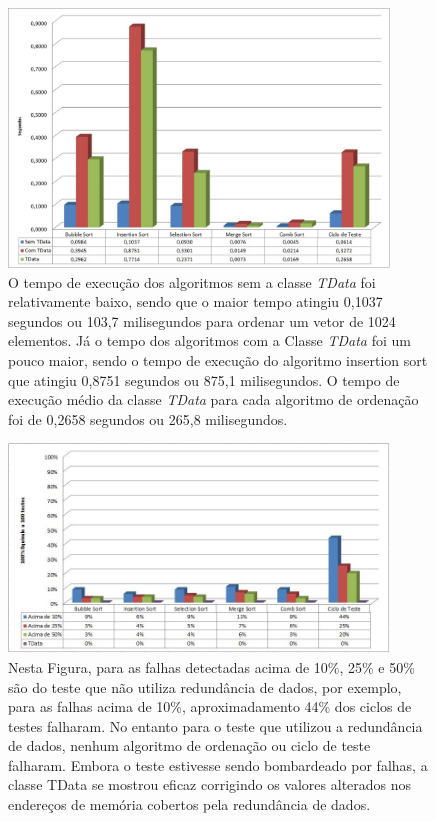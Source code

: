 \begin{figure}[h]
	\centering
	\includegraphics[width=0.9\textwidth]{figuras/tempoTData.jpg}
	\caption[Tempo de execução da Classe \textit{TData}]{O tempo de execução dos algoritmos sem a classe \textit{TData} foi relativamente baixo, sendo que o maior tempo atingiu 0,1037 segundos ou 103,7 milisegundos para ordenar um vetor de 1024 elementos. Já o tempo dos algoritmos com a Classe \textit{TData} foi um pouco maior, sendo o tempo de execução do algoritmo insertion sort que atingiu 0,8751 segundos ou 875,1 milisegundos. O tempo de execução médio da classe \textit{TData} para cada algoritmo de ordenação foi de 0,2658 segundos ou 265,8 milisegundos.}

	\label{Img:tempoTData}	
\end{figure}

\begin{figure}[h]
	\centering
	\includegraphics[width=0.9\textwidth]{figuras/falhaTData.jpg}
	\caption[Teste de redundância de dados da classe \textit{TData}]{Nesta Figura, para as falhas detectadas acima de 10\%, 25\% e 50\% são do teste que não utiliza redundância de dados, por exemplo, para as falhas acima de 10\%, aproximadamento 44\% dos ciclos de testes falharam. No entanto para o teste que utilizou a redundância de dados, nenhum algoritmo de ordenação ou ciclo de teste falharam. Embora o teste estivesse sendo bombardeado por falhas, a classe TData se mostrou eficaz corrigindo os valores alterados nos endereços de memória cobertos pela redundância de dados.}
	\label{Img:falhaTData}	
\end{figure}


